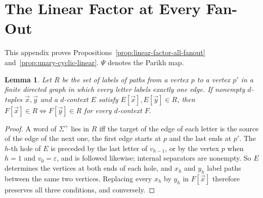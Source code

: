 \documentclass[11pt]{article}
\numberwithin{equation}{section}
\theoremstyle{plain}
\newtheorem{lemma}[theorem]{Lemma}
\theoremstyle{definition}
\theoremstyle{remark}
\newcommand{\tuple}[1]{\vec{#1}}
\newcommand{\eps}{\varepsilon}
\begin{document}
\section{The Linear Factor at Every Fan-Out}
\label{app:linear-factor-fanout}

This appendix proves Propositions~\ref{prop:linear-factor-all-fanout}
and~\ref{prop:unary-cyclic-linear}.  $\Psi$ denotes the Parikh map.

\begin{lemma}\label{lem:app-lf-path}
Let $R$ be the set of labels of paths from a vertex $p$ to a vertex $p'$ in a
finite directed graph in which every letter labels exactly one edge.  If
nonempty $d$-tuples $\tuple x,\tuple y$ and a $d$-context $E$ satisfy
$E[\tuple x],E[\tuple y]\in R$, then $F[\tuple x]\in R\iff F[\tuple y]\in R$ for
every $d$-context $F$.
\end{lemma}

\begin{proof}
A word of $\Sigma^+$ lies in $R$ iff the target of the edge of each letter is the
source of the edge of the next one, the first edge starts at $p$ and the last
ends at $p'$.  The $h$-th hole of $E$ is preceded by the last letter of
$v_{h-1}$, or by the vertex $p$ when $h=1$ and $v_0=\eps$, and is followed
likewise; internal separators are nonempty.  So $E$ determines the vertices at
both ends of each hole, and $x_h$ and $y_h$ label paths between the same two
vertices.  Replacing every $x_h$ by $y_h$ in $F[\tuple x]$ therefore preserves
all three conditions, and conversely.
\end{proof}
\end{document}

